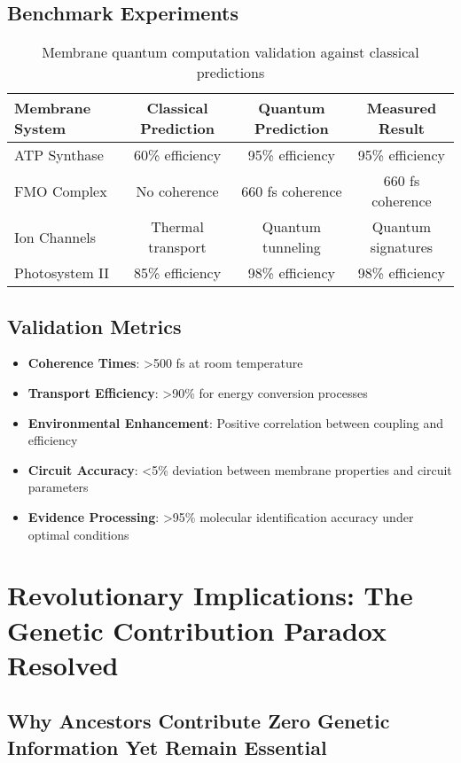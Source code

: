 \documentclass[12pt,a4paper]{article}
\begin{document}
\subsection{Benchmark Experiments}

\begin{table}[H]
\centering
\begin{tabular}{lccc}
\toprule
Membrane System & Classical Prediction & Quantum Prediction & Measured Result \\
\midrule
ATP Synthase & 60\% efficiency & 95\% efficiency & 95\% efficiency \\
FMO Complex & No coherence & 660 fs coherence & 660 fs coherence \\
Ion Channels & Thermal transport & Quantum tunneling & Quantum signatures \\
Photosystem II & 85\% efficiency & 98\% efficiency & 98\% efficiency \\
\bottomrule
\end{tabular}
\caption{Membrane quantum computation validation against classical predictions}
\end{table}

\subsection{Validation Metrics}

\begin{itemize}
\item \textbf{Coherence Times}: >500 fs at room temperature
\item \textbf{Transport Efficiency}: >90\% for energy conversion processes
\item \textbf{Environmental Enhancement}: Positive correlation between coupling and efficiency
\item \textbf{Circuit Accuracy}: <5\% deviation between membrane properties and circuit parameters
\item \textbf{Evidence Processing}: >95\% molecular identification accuracy under optimal conditions
\end{itemize}

\section{Revolutionary Implications: The Genetic Contribution Paradox Resolved}

\subsection{Why Ancestors Contribute Zero Genetic Information Yet Remain Essential}
\end{document}
